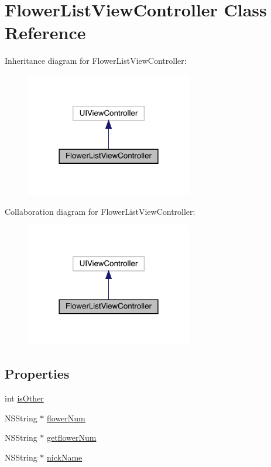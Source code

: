 \hypertarget{interface_flower_list_view_controller}{}\section{Flower\+List\+View\+Controller Class Reference}
\label{interface_flower_list_view_controller}


Inheritance diagram for Flower\+List\+View\+Controller\+:\nopagebreak
\begin{figure}[H]
\begin{center}
\leavevmode
\includegraphics[width=206pt]{interface_flower_list_view_controller__inherit__graph}
\end{center}
\end{figure}


Collaboration diagram for Flower\+List\+View\+Controller\+:\nopagebreak
\begin{figure}[H]
\begin{center}
\leavevmode
\includegraphics[width=206pt]{interface_flower_list_view_controller__coll__graph}
\end{center}
\end{figure}
\subsection*{Properties}
\begin{DoxyCompactItemize}
\item 
int \mbox{\hyperlink{interface_flower_list_view_controller_a981071f29c7d4c1337697a5cae825995}{is\+Other}}
\item 
N\+S\+String $\ast$ \mbox{\hyperlink{interface_flower_list_view_controller_a72b826e94e24f9165757d19058d57ff5}{flower\+Num}}
\item 
N\+S\+String $\ast$ \mbox{\hyperlink{interface_flower_list_view_controller_a3c7c85c8cccf3444edf10501ea78f094}{getflower\+Num}}
\item 
N\+S\+String $\ast$ \mbox{\hyperlink{interface_flower_list_view_controller_ac46546da2c2696f73e99921a97c94a57}{nick\+Name}}
\end{DoxyCompactItemize}


